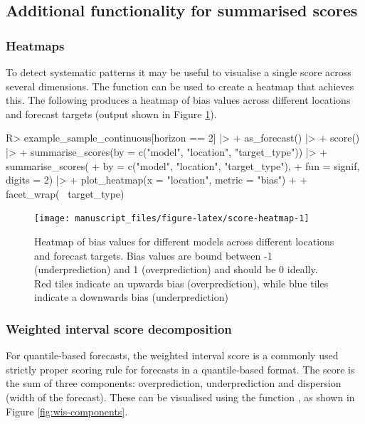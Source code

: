 \documentclass[
]{jss}
\begin{document}
\subsection{Additional functionality for summarised
scores}\label{additional-functionality-for-summarised-scores}

\subsubsection{Heatmaps}\label{heatmaps}

To detect systematic patterns it may be useful to visualise a single
score across several dimensions. The function  can
be used to create a heatmap that achieves this. The following produces a
heatmap of bias values across different locations and forecast targets
(output shown in Figure \ref{fig:score-heatmap}).

\begin{CodeChunk}
\begin{CodeInput}
R> example_sample_continuous[horizon == 2] |>
+   as_forecast() |>
+   score() |>
+   summarise_scores(by = c("model", "location", "target_type")) |>
+   summarise_scores(
+     by = c("model", "location", "target_type"), 
+     fun = signif, digits = 2) |>
+   plot_heatmap(x = "location", metric = "bias") + 
+     facet_wrap(~ target_type) 
\end{CodeInput}
\begin{figure}[!h]

{\centering \texttt{[image: manuscript\_files/figure-latex/score-heatmap-1]} 

}

\caption[Heatmap of bias values for different models across different locations and forecast targets]{Heatmap of bias values for different models across different locations and forecast targets. Bias values are bound between -1 (underprediction) and 1 (overprediction) and should be 0 ideally. Red tiles indicate an upwards bias (overprediction), while blue tiles indicate a downwards bias (underprediction)}\label{fig:score-heatmap}
\end{figure}
\end{CodeChunk}

\subsubsection{Weighted interval score
decomposition}\label{weighted-interval-score-decomposition}

For quantile-based forecasts, the weighted interval score
\citep[WIS, ][see Section \ref{sec:wis} in the Appendix]{bracherEvaluatingEpidemicForecasts2021}
is a commonly used strictly proper scoring rule for forecasts in a
quantile-based format. The score is the sum of three components:
overprediction, underprediction and dispersion (width of the forecast).
These can be visualised using the function , as shown
in Figure \ref{fig:wis-components}.
\end{document}
